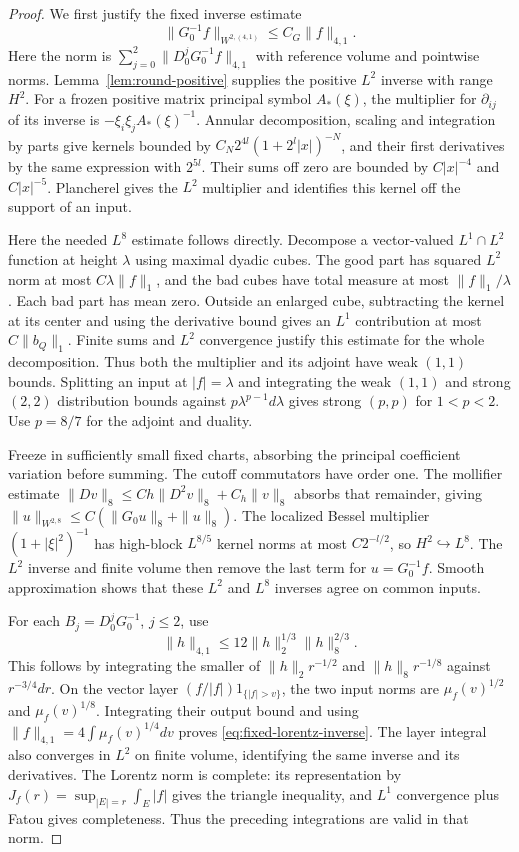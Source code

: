\documentclass[11pt]{article}
\numberwithin{equation}{section}
\theoremstyle{definition}
\theoremstyle{remark}
\begin{document}
\begin{proof}
We first justify the fixed inverse estimate
\begin{equation}\label{eq:fixed-lorentz-inverse}
 \|G_0^{-1}f\|_{W^{2,(4,1)}}\le C_G\|f\|_{4,1}.
\end{equation}
Here the norm is $\sum_{j=0}^2\|D_0^jG_0^{-1}f\|_{4,1}$
with reference volume and pointwise norms.
Lemma~\ref{lem:round-positive} supplies the positive
$L^2$ inverse with range $H^2$.
For a frozen positive matrix principal symbol $A_*(\xi)$,
the multiplier for $\partial_{ij}$ of its inverse is
$-\xi_i\xi_jA_*(\xi)^{-1}$.
Annular decomposition, scaling and integration by parts
give kernels bounded by
$C_N2^{4l}(1+2^l|x|)^{-N}$, and their first derivatives
by the same expression with $2^{5l}$.
Their sums off zero are bounded by $C|x|^{-4}$ and
$C|x|^{-5}$. Plancherel gives the $L^2$ multiplier
and identifies this kernel off the support of an input.

Here the needed $L^8$ estimate follows directly.
Decompose a vector-valued $L^1\cap L^2$ function at
height $\lambda$ using maximal dyadic cubes.
The good part has squared $L^2$ norm at most
$C\lambda\|f\|_1$, and the bad cubes have total measure
at most $\|f\|_1/\lambda$. Each bad part has mean zero.
Outside an enlarged cube, subtracting the kernel at
its center and using the derivative bound gives
an $L^1$ contribution at most $C\|b_Q\|_1$.
Finite sums and $L^2$ convergence justify this estimate
for the whole decomposition. Thus both the multiplier
and its adjoint have weak $(1,1)$ bounds.
Splitting an input at $|f|=\lambda$ and integrating
the weak $(1,1)$ and strong $(2,2)$ distribution bounds
against $p\lambda^{p-1}d\lambda$ gives strong $(p,p)$
for $1<p<2$. Use $p=8/7$ for the adjoint and duality.

Freeze in sufficiently small fixed charts, absorbing
the principal coefficient variation before summing.
The cutoff commutators have order one.
The mollifier estimate
$\|Dv\|_8\le Ch\|D^2v\|_8+C_h\|v\|_8$
absorbs that remainder, giving
$\|u\|_{W^{2,8}}\le C(\|G_0u\|_8+\|u\|_8)$.
The localized Bessel multiplier $(1+|\xi|^2)^{-1}$
has high-block $L^{8/5}$ kernel norms at most
$C2^{-l/2}$, so $H^2\hookrightarrow L^8$.
The $L^2$ inverse and finite volume then remove
the last term for $u=G_0^{-1}f$.
Smooth approximation shows that these $L^2$ and $L^8$
inverses agree on common inputs.

For each $B_j=D_0^jG_0^{-1}$, $j\le2$, use
\[
 \|h\|_{4,1}\le12\|h\|_2^{1/3}\|h\|_8^{2/3}.
\]
This follows by integrating the smaller of
$\|h\|_2r^{-1/2}$ and $\|h\|_8r^{-1/8}$ against
$r^{-3/4}dr$.
On the vector layer $(f/|f|)1_{\{|f|>v\}}$, the two
input norms are $\mu_f(v)^{1/2}$ and $\mu_f(v)^{1/8}$.
Integrating their output bound and using
$\|f\|_{4,1}=4\int\mu_f(v)^{1/4}dv$ proves
\eqref{eq:fixed-lorentz-inverse}.
The layer integral also converges in $L^2$ on finite
volume, identifying the same inverse and its derivatives.
The Lorentz norm is complete: its representation by
$J_f(r)=\sup_{|E|=r}\int_E|f|$ gives the triangle
inequality, and $L^1$ convergence plus Fatou gives
completeness. Thus the preceding integrations are
valid in that norm.


\end{proof}
\end{document}
